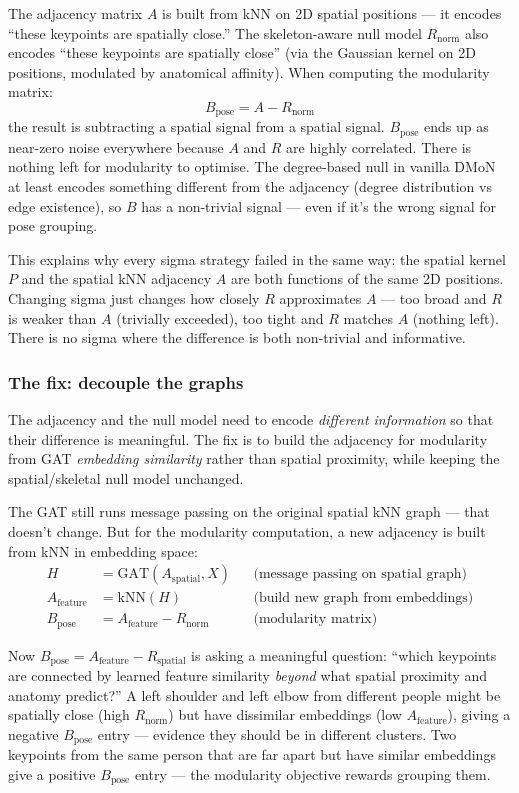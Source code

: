 The adjacency matrix $A$ is built from kNN on 2D spatial positions --- it encodes ``these keypoints are spatially close.'' The skeleton-aware null model $R_{\text{norm}}$ also encodes ``these keypoints are spatially close'' (via the Gaussian kernel on 2D positions, modulated by anatomical affinity). When computing the modularity matrix:
\[
B_{\text{pose}} = A - R_{\text{norm}}
\]
the result is subtracting a spatial signal from a spatial signal. $B_{\text{pose}}$ ends up as near-zero noise everywhere because $A$ and $R$ are highly correlated. There is nothing left for modularity to optimise. The degree-based null in vanilla DMoN at least encodes something different from the adjacency (degree distribution vs edge existence), so $B$ has a non-trivial signal --- even if it's the wrong signal for pose grouping.

This explains why every sigma strategy failed in the same way: the spatial kernel $P$ and the spatial kNN adjacency $A$ are both functions of the same 2D positions. Changing sigma just changes how closely $R$ approximates $A$ --- too broad and $R$ is weaker than $A$ (trivially exceeded), too tight and $R$ matches $A$ (nothing left). There is no sigma where the difference is both non-trivial and informative.


\subsubsection{The fix: decouple the graphs}

The adjacency and the null model need to encode \emph{different information} so that their difference is meaningful. The fix is to build the adjacency for modularity from GAT \emph{embedding similarity} rather than spatial proximity, while keeping the spatial/skeletal null model unchanged.

The GAT still runs message passing on the original spatial kNN graph --- that doesn't change. But for the modularity computation, a new adjacency is built from kNN in embedding space:
\begin{align*}
H &= \text{GAT}(A_{\text{spatial}}, X) && \text{(message passing on spatial graph)} \\
A_{\text{feature}} &= \text{kNN}(H) && \text{(build new graph from embeddings)} \\
B_{\text{pose}} &= A_{\text{feature}} - R_{\text{norm}} && \text{(modularity matrix)}
\end{align*}

Now $B_{\text{pose}} = A_{\text{feature}} - R_{\text{spatial}}$ is asking a meaningful question: ``which keypoints are connected by learned feature similarity \emph{beyond} what spatial proximity and anatomy predict?'' A left shoulder and left elbow from different people might be spatially close (high $R_{\text{norm}}$) but have dissimilar embeddings (low $A_{\text{feature}}$), giving a negative $B_{\text{pose}}$ entry --- evidence they should be in different clusters. Two keypoints from the same person that are far apart but have similar embeddings give a positive $B_{\text{pose}}$ entry --- the modularity objective rewards grouping them.

